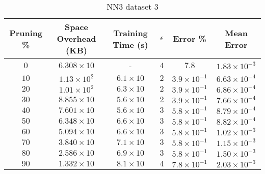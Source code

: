 \begin{adjustwidth}{0cm}{}
\begin{table}
\caption{NN3 dataset 3}\label{pr33}
\begin{tabular}{cccccc}
\hline
\toprule
Pruning \% & Space Overhead (KB) & Training Time (s) & $\epsilon$ & Error \% & Mean Error\\
\midrule
$0$ & $6.308 \times 10$ & - & $4$ & $7.8$ & $1.83 \times 10^{-3}$\\
$10$ & $1.13 \times 10^2 $ & $6.1 \times 10$ & $2$ & $3.9 \times 10^{-1}$ & $6.63 \times 10^{-4}$\\
$20$ & $1.01 \times 10^2 $ & $6.3 \times 10$ & $2$ & $3.9 \times 10^{-1}$ & $6.86 \times 10^{-4}$\\
$30$ & $8.855 \times 10$ & $5.6 \times 10$ & $2$ & $3.9 \times 10^{-1}$ & $7.66 \times 10^{-4}$\\
$40$ & $7.601 \times 10$ & $5.6 \times 10$ & $3$ & $5.8 \times 10^{-1}$ & $8.79 \times 10^{-4}$\\
$50$ & $6.348 \times 10$ & $6.6 \times 10$ & $3$ & $5.8 \times 10^{-1}$ & $8.82 \times 10^{-4}$\\
$60$ & $5.094 \times 10$ & $6.6 \times 10$ & $3$ & $5.8 \times 10^{-1}$ & $1.02 \times 10^{-3}$\\
$70$ & $3.840 \times 10$ & $7.1 \times 10$ & $3$ & $5.8 \times 10^{-1}$ & $1.15 \times 10^{-3}$\\
$80$ & $2.586 \times 10$ & $6.9 \times 10$ & $3$ & $5.8 \times 10^{-1}$ & $1.50 \times 10^{-3}$\\
$90$ & $1.332 \times 10$ & $8.1 \times 10$ & $4$ & $7.8 \times 10^{-1}$ & $2.03 \times 10^{-3}$\\
\bottomrule
\end{tabular}
\end{table}
\end{adjustwidth}

